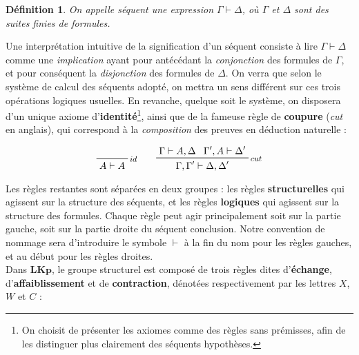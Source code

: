 \documentclass[12pt]{report}
\newcommand{\seq}{\vdash}
\newcommand{\irule}[1]{\footnotesize$#1$}
\newcommand{\iruleL}[1]{\irule{{#1}\seq}}
\newcommand{\iruleR}[1]{\irule{\seq{#1}}}
\newtheorem{definition}{Définition}
\begin{document}
\begin{definition}
    On appelle \emph{séquent} une expression $\Gamma \seq \Delta$, où $\Gamma$ et $\Delta$ sont des suites finies de formules.
\end{definition}

Une interprétation intuitive de la signification d'un séquent consiste à lire $\Gamma \seq \Delta$ comme une \emph{implication} ayant pour antécédant la \emph{conjonction} des formules de $\Gamma$, et pour conséquent la \emph{disjonction} des formules de $\Delta$. On verra que selon le système de calcul des séquents adopté, on mettra un sens différent sur ces trois opérations logiques usuelles. En revanche, quelque soit le système, on disposera d'un unique axiome d'\textbf{identité}\footnote{On choisit de présenter les axiomes comme des règles sans prémisses, afin de les distinguer plus clairement des séquents hypothèses.}, ainsi que de la fameuse règle de \textbf{coupure} (\emph{cut} en anglais), qui correspond à la \emph{composition} des preuves en déduction naturelle :

\begin{displaymath}
    \prfbyaxiom{\irule{id}}{A \seq A}
    \qquad
    \prftree[r]{\irule{cut}}
        {\Gamma \seq A,\Delta}
        {\Gamma',A \seq \Delta'}
        {\Gamma,\Gamma' \seq \Delta,\Delta'}
\end{displaymath}

Les règles restantes sont séparées en deux groupes : les règles \textbf{structurelles} qui agissent sur la structure des séquents, et les règles \textbf{logiques} qui agissent sur la structure des formules. Chaque règle peut agir principalement soit sur la partie gauche, soit sur la partie droite du séquent conclusion. Notre convention de nommage sera d'introduire le symbole $\seq$ à la fin du nom pour les règles gauches, et au début pour les règles droites.\\

Dans $\mathbf{LKp}$, le groupe structurel est composé de trois règles dites d'\textbf{échange}, d'\textbf{affaiblissement} et de \textbf{contraction}, dénotées respectivement par les lettres $X$, $W$ et $C$ :

\end{document}
